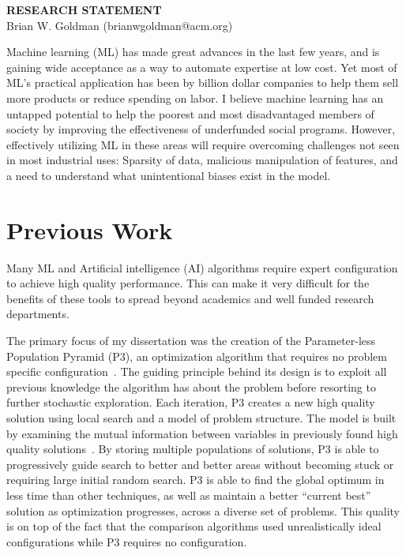 \documentclass[a4paper, 11pt]{article}
\begin{document}
\thispagestyle{empty}

\pagestyle{fancy}

\begin{center}
{\LARGE \bf RESEARCH STATEMENT}\\
\vspace*{0.1cm}
{\normalsize Brian W. Goldman (brianwgoldman@acm.org)}
\end{center}

\noindent
Machine learning (ML) has made great advances in the last few years, and is gaining wide
acceptance as a way to automate expertise at low cost. Yet most of ML's practical application has
been by billion dollar companies to help them sell more products or reduce spending on labor.
I believe machine learning has an untapped potential to help the poorest and most disadvantaged members
of society by improving the effectiveness of underfunded social programs. However, effectively utilizing
ML in these areas will require overcoming challenges not seen in most industrial uses: Sparsity of data,
malicious manipulation of features, and a need to understand what unintentional biases exist in the model.




\section{Previous Work}
Many ML and Artificial intelligence (AI) algorithms require expert configuration
to achieve high quality performance. This can make it very difficult for
the benefits of these tools to spread beyond academics and well funded
research departments.

The primary focus of my dissertation was the creation of the
Parameter-less Population Pyramid (P3), an optimization algorithm
that requires no problem specific configuration~\cite{goldman:2014:p3,goldman:2015:fastp3,goldman:2016:p3hiff}.
The guiding principle behind its design is to exploit all previous
knowledge the algorithm has about the problem before resorting to further stochastic exploration.
Each iteration, P3 creates a new high quality solution using local search and a model of
problem structure. The model is built by examining the mutual information between variables
in previously found high quality solutions~\cite{goldman:2012:ltga}.
By storing multiple populations of solutions, P3 is able to progressively guide search
to better and better areas without becoming stuck or requiring large initial random search.
P3 is able to find the global optimum in less time than other techniques, as well as
maintain a better ``current best'' solution as optimization progresses, across a diverse set of problems.
This quality is on top
of the fact that the comparison algorithms used unrealistically ideal configurations while
P3 requires no configuration.
\end{document}
